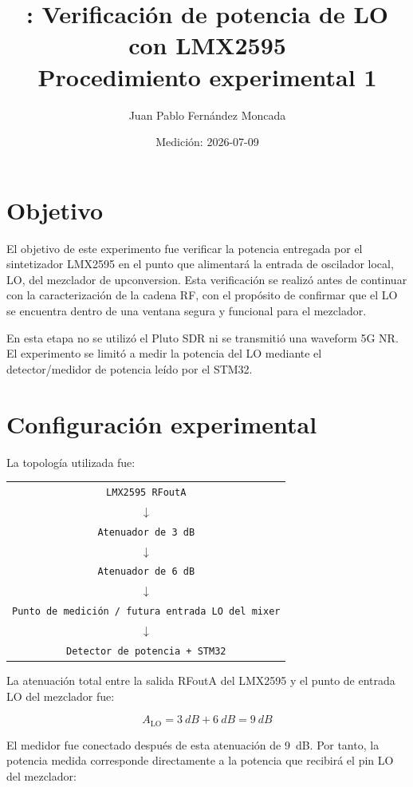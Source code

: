 \documentclass[12pt,a4paper]{article}
\title{\textbf{\expid: Verificación de potencia de LO con LMX2595}\\
\large Procedimiento experimental 1 \campaign}
\author{Juan Pablo Fernández Moncada}
\date{Medición: 2026-07-09}
\begin{document}
\maketitle

\section{Objetivo}

El objetivo de este experimento fue verificar la potencia entregada por el sintetizador LMX2595 en el punto que alimentará la entrada de oscilador local, LO, del mezclador de upconversion. Esta verificación se realizó antes de continuar con la caracterización de la cadena RF, con el propósito de confirmar que el LO se encuentra dentro de una ventana segura y funcional para el mezclador.

En esta etapa no se utilizó el Pluto SDR ni se transmitió una waveform 5G NR. El experimento se limitó a medir la potencia del LO mediante el detector/medidor de potencia leído por el STM32.

\section{Configuración experimental}

La topología utilizada fue:

\begin{center}
\begin{tabular}{c}
\texttt{LMX2595 RFoutA} \\
$\downarrow$ \\
\texttt{Atenuador de \SI{3}{dB}} \\
$\downarrow$ \\
\texttt{Atenuador de \SI{6}{dB}} \\
$\downarrow$ \\
\texttt{Punto de medición / futura entrada LO del mixer} \\
$\downarrow$ \\
\texttt{Detector de potencia + STM32}
\end{tabular}
\end{center}

La atenuación total entre la salida RFoutA del LMX2595 y el punto de entrada LO del mezclador fue:

\begin{equation}
A_{\mathrm{LO}} = \SI{3}{dB} + \SI{6}{dB} = \SI{9}{dB}
\end{equation}

El medidor fue conectado después de esta atenuación de \SI{9}{dB}. Por tanto, la potencia medida corresponde directamente a la potencia que recibirá el pin LO del mezclador:
\end{document}
